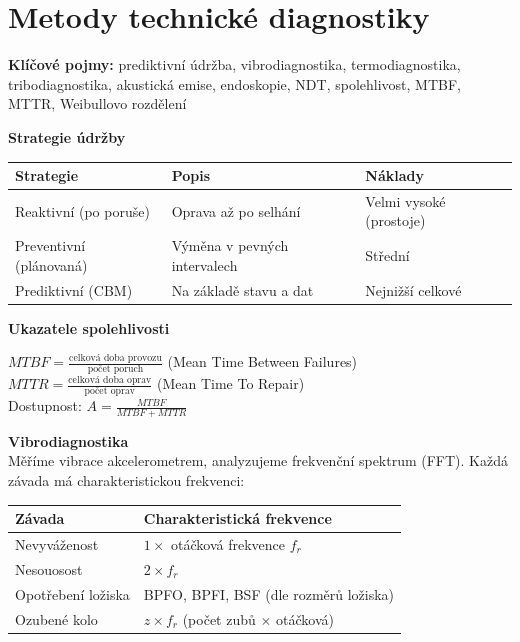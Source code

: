 \documentclass[a4paper,10pt]{article}
\begin{document}
\section{Metody technické diagnostiky}

\begin{pojmybox}
\textbf{Klíčové pojmy:}
prediktivní údržba, vibrodiagnostika, termodiagnostika,
tribodiagnostika, akustická emise, endoskopie, NDT,
spolehlivost, MTBF, MTTR, Weibullovo rozdělení
\end{pojmybox}

\begin{vysvetlenibox}
\textbf{Strategie údržby}

\begin{center}
\begin{tabularx}{0.95\linewidth}{@{} l X X @{}}
    \toprule
    \textbf{Strategie} & \textbf{Popis} & \textbf{Náklady} \\
    \midrule
    Reaktivní (po poruše) & Oprava až po selhání & Velmi vysoké (prostoje) \\
    Preventivní (plánovaná) & Výměna v pevných intervalech & Střední \\
    Prediktivní (CBM) & Na základě stavu a dat & Nejnižší celkové \\
    \bottomrule
\end{tabularx}
\end{center}

\textbf{Ukazatele spolehlivosti}

\begin{vzorcebox}
$MTBF = \frac{\text{celková doba provozu}}{\text{počet poruch}}$
\quad (Mean Time Between Failures)\\
$MTTR = \frac{\text{celková doba oprav}}{\text{počet oprav}}$
\quad (Mean Time To Repair)\\
Dostupnost: $A = \frac{MTBF}{MTBF + MTTR}$
\end{vzorcebox}

\textbf{Vibrodiagnostika}\\
Měříme vibrace akcelerometrem, analyzujeme frekvenční spektrum (FFT).
Každá závada má charakteristickou frekvenci:

\begin{center}
\begin{tabularx}{0.95\linewidth}{@{} l X @{}}
    \toprule
    \textbf{Závada} & \textbf{Charakteristická frekvence} \\
    \midrule
    Nevyváženost    & $1\times$ otáčková frekvence $f_r$ \\
    Nesouosost      & $2\times f_r$ \\
    Opotřebení ložiska & BPFO, BPFI, BSF (dle rozměrů ložiska) \\
    Ozubené kolo    & $z \times f_r$ (počet zubů $\times$ otáčková) \\
    \bottomrule
\end{tabularx}
\end{center}


\end{vysvetlenibox}
\end{document}
